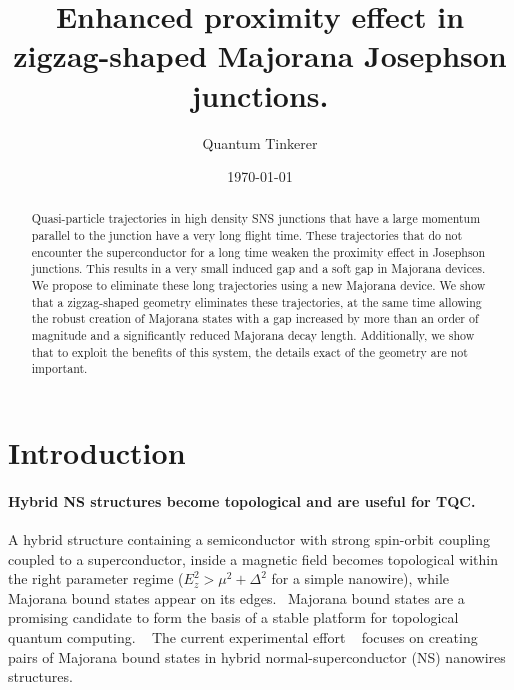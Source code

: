\documentclass[english, twocolumn, 10pt, aps, superscriptaddress, floatfix, prb, citeautoscript]{revtex4-1}
\renewcommand{\comment}[2]{#2}
\renewcommand{\comment}{\paragraph}
\begin{document}
\title{Enhanced proximity effect in zigzag-shaped Majorana Josephson junctions.}

\author{Quantum Tinkerer}

\date{\today}
\begin{abstract}
Quasi-particle trajectories in high density SNS junctions that have a large momentum parallel to the junction have a very long flight time.
These trajectories that do not encounter the superconductor for a long time weaken the proximity effect in Josephson junctions.
This results in a very small induced gap and a soft gap in Majorana devices.
We propose to eliminate these long trajectories using a new Majorana device.
We show that a zigzag-shaped geometry eliminates these trajectories, at the same time allowing the robust creation of Majorana states with a gap increased by more than an order of magnitude and a significantly reduced Majorana decay length.
Additionally, we show that to exploit the benefits of this system, the details exact of the geometry are not important.
\end{abstract}

\maketitle

\section{Introduction}
\comment{Hybrid NS structures become topological and are useful for TQC.}
A hybrid structure containing a semiconductor with strong spin-orbit coupling coupled to a superconductor, inside a magnetic field becomes topological within the right parameter regime ($E_z^2>\mu^2+\Delta^2$ for a simple nanowire), while Majorana bound states appear on its edges.~\cite{lutchyn_majorana_2010,oreg_helical_2010}
Majorana bound states are a promising candidate to form the basis of a stable platform for topological quantum computing. ~\cite{alicea2012new,beenakker2013search}
The current experimental effort ~\cite{mourik_signatures_2012,das_zero-bias_2012,deng_anomalous_2012,churchill_superconductor-nanowire_2013,zhang2018quantized} focuses on creating pairs of Majorana bound states in hybrid normal-superconductor (NS) nanowires structures.
\end{document}
